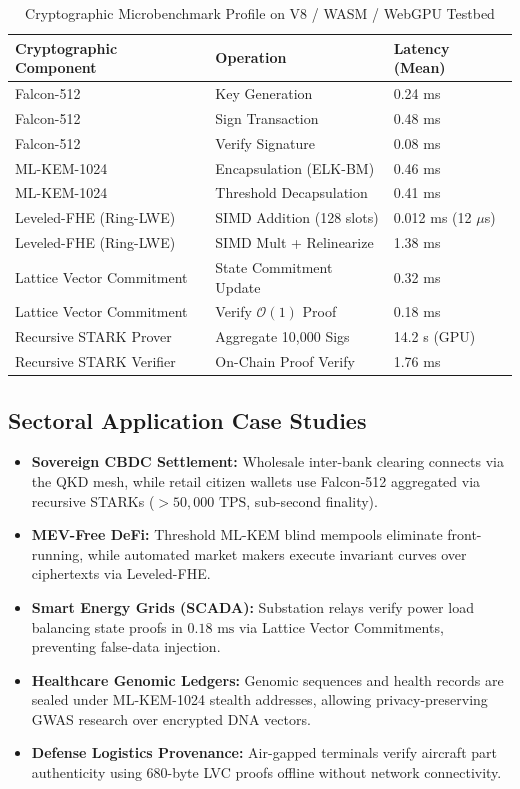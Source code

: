 \documentclass[runningheads]{llncs}
\begin{document}
\begin{table}[t]
\caption{Cryptographic Microbenchmark Profile on V8 / WASM / WebGPU Testbed}\label{tab:bench}
\centering
\begin{tabular}{lll}
\toprule
\textbf{Cryptographic Component} & \textbf{Operation} & \textbf{Latency (Mean)} \\
\midrule
Falcon-512 & Key Generation & 0.24 ms \\
Falcon-512 & Sign Transaction & 0.48 ms \\
Falcon-512 & Verify Signature & 0.08 ms \\
ML-KEM-1024 & Encapsulation (ELK-BM) & 0.46 ms \\
ML-KEM-1024 & Threshold Decapsulation & 0.41 ms \\
Leveled-FHE (Ring-LWE) & SIMD Addition (128 slots) & 0.012 ms (12 $\mu$s) \\
Leveled-FHE (Ring-LWE) & SIMD Mult + Relinearize & 1.38 ms \\
Lattice Vector Commitment & State Commitment Update & 0.32 ms \\
Lattice Vector Commitment & Verify $\mathcal{O}(1)$ Proof & 0.18 ms \\
Recursive STARK Prover & Aggregate 10,000 Sigs & 14.2 s (GPU) \\
Recursive STARK Verifier & On-Chain Proof Verify & 1.76 ms \\
\bottomrule
\end{tabular}
\end{table}

\subsection{Sectoral Application Case Studies}
\begin{itemize}
    \item \textbf{Sovereign CBDC Settlement:} Wholesale inter-bank clearing connects via the QKD mesh, while retail citizen wallets use Falcon-512 aggregated via recursive STARKs ($> 50,000\text{ TPS}$, sub-second finality).
    \item \textbf{MEV-Free DeFi:} Threshold ML-KEM blind mempools eliminate front-running, while automated market makers execute invariant curves over ciphertexts via Leveled-FHE.
    \item \textbf{Smart Energy Grids (SCADA):} Substation relays verify power load balancing state proofs in $0.18\text{ ms}$ via Lattice Vector Commitments, preventing false-data injection.
    \item \textbf{Healthcare Genomic Ledgers:} Genomic sequences and health records are sealed under ML-KEM-1024 stealth addresses, allowing privacy-preserving GWAS research over encrypted DNA vectors.
    \item \textbf{Defense Logistics Provenance:} Air-gapped terminals verify aircraft part authenticity using 680-byte LVC proofs offline without network connectivity.
\end{itemize}
\end{document}
